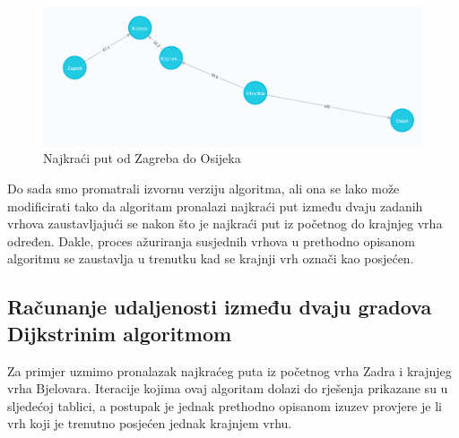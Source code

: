 \documentclass[10pt]{scrartcl}
\begin{document}
\begin{figure}[H]
    \centering
    \includegraphics[scale=0.3]{zg-os}
    \caption{Najkraći put od Zagreba do Osijeka}
\end{figure}


Do sada smo promatrali izvornu verziju algoritma, ali ona se lako može modificirati tako da algoritam pronalazi najkraći put između dvaju zadanih vrhova zaustavljajući se nakon što je najkraći put iz početnog do krajnjeg vrha određen. Dakle, proces ažuriranja susjednih vrhova u prethodno opisanom algoritmu se zaustavlja u trenutku kad se krajnji vrh označi kao posjećen.


\subsection{Računanje udaljenosti između dvaju gradova Dijkstrinim algoritmom}

Za primjer uzmimo pronalazak najkraćeg puta iz početnog vrha Zadra i krajnjeg vrha Bjelovara. Iteracije kojima ovaj algoritam dolazi do rješenja prikazane su u sljedećoj tablici, a postupak je jednak prethodno opisanom izuzev provjere je li vrh koji je trenutno posjećen jednak krajnjem vrhu.
\end{document}

